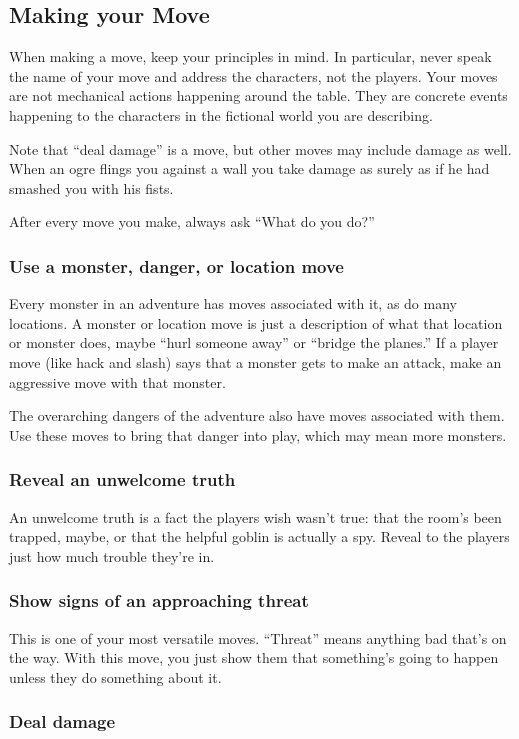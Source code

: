 \subsection{Making your Move}

When making a move, keep your principles in mind. In particular, never speak the name of your move and address the characters, not the players. Your moves are not mechanical actions happening around the table. They are concrete events happening to the characters in the fictional world you are describing.

Note that ``deal damage'' is a move, but other moves may include damage as well. When an ogre flings you against a wall you take damage as surely as if he had smashed you with his fists.

After every move you make, always ask ``What do you do?''
\subsubsection{Use a monster, danger, or location move}

Every monster in an adventure has moves associated with it, as do many locations. A monster or location move is just a description of what that location or monster does, maybe ``hurl someone away'' or ``bridge the planes.'' If a player move (like hack and slash) says that a monster gets to make an attack, make an aggressive move with that monster.

The overarching dangers of the adventure also have moves associated with them. Use these moves to bring that danger into play, which may mean more monsters.
\subsubsection{Reveal an unwelcome truth}

An unwelcome truth is a fact the players wish wasn't true: that the room's been trapped, maybe, or that the helpful goblin is actually a spy. Reveal to the players just how much trouble they're in.
\subsubsection{Show signs of an approaching threat}

This is one of your most versatile moves. ``Threat'' means anything bad that's on the way. With this move, you just show them that something's going to happen unless they do something about it.
\subsubsection{Deal damage}

